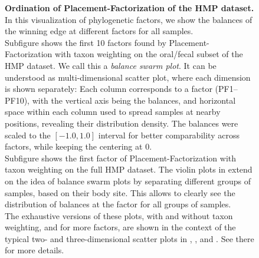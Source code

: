 \begin{figure}[hbt!]
    \centering
    \begin{subfigure}{0pt}
        \label{fig:hmp_pf:sub:of_600_swarm}
    \end{subfigure}
    \begin{subfigure}{0pt}
        \label{fig:hmp_pf:sub:all_violin}
    \end{subfigure}
    \caption[Ordination of Placement-Factorization of the \acs{HMP} dataset]{
        \textbf{Ordination of Placement-Factorization of the \ac{HMP} dataset.}
        In this visualization of phylogenetic factors,
        we show the balances of the winning edge at different factors for all samples.
        \\
        Subfigure  shows the first \num{10} factors
        found by Placement-Factorization with taxon weighting on the oral/fecal subset of the \ac{HMP} dataset.
        We call this a \emph{balance swarm plot}.
        It can be understood as multi-dimensional scatter plot, where each dimension is shown separately:
        Each column corresponds to a factor (PF1--PF10), with the vertical axis being the balances,
        and horizontal space within each column used to spread samples at nearby positions,
        revealing their distribution density.
        The balances were scaled to the $[-1.0, 1.0]$ interval for better comparability across factors,
        while keeping the centering at \num{0}.
        \\
        Subfigure  shows the first factor of Placement-Factorization with taxon weighting
        on the full \ac{HMP} dataset.
        The violin plots in  extend on the idea of balance swarm plots
        by separating different groups of samples, based on their body site.
        This allows to clearly see the distribution of balances at the factor for all groups of samples.
        \\
        The exhaustive versions of these plots, with and without taxon weighting, and for more factors,
        are shown in the context of the typical two- and three-dimensional scatter plots in
        , , and
        .
        See there for more details.
    }
    \label{fig:hmp_pf}
\end{figure}

